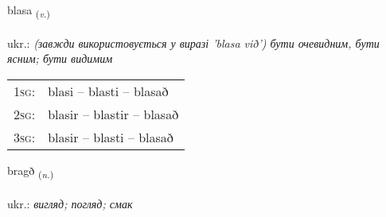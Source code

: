 \documentclass[frontgrid, backgrid]{flacards}\usepackage[]{graphicx}\usepackage[]{xcolor}
\begin{document}
\renewcommand{\flhead}{\vskip5pt \fboxsep=0pt {\small\bfseries\footnotesize Sagnorð | дієслово}}
\renewcommand{\fcfoot}{\vskip5pt \fboxsep=0pt \hspace{2pt}{\small\bfseries\footnotesize 2K}}

\renewcommand{\blhead}{\vskip5pt {\small\bfseries\footnotesize Sagnorð | дієслово }}
\renewcommand{\bcfoot}{\vskip5pt \hspace{2pt}{\small\bfseries\footnotesize 2K}}


{blasa \small{\textsubscript{(\textit{v.})}} \\[1ex] %
\textphonetic{[plaːsa]} \\
ukr.: \emph{(завжди використовується у виразі 'blasa við') бути очевидним, бути ясним; бути видимим} \\  [2ex]
\renewcommand*{\arraystretch}{0.8}
\begin{tabular}{p{1cm}l}
\textsc{1sg}: & blasi -- blasti -- blasað \\ 
\textsc{2sg}: & blasir -- blastir -- blasað \\ 
\textsc{3sg}: & blasir -- blasti -- blasað \\ 
\end{tabular}
}

\renewcommand{\flhead}{\vskip5pt \fboxsep=0pt {\small\bfseries\footnotesize Nafnorð | іменник}}
\renewcommand{\fcfoot}{\vskip5pt \fboxsep=0pt \hspace{2pt}{\small\bfseries\footnotesize 2K}}

\renewcommand{\blhead}{\vskip5pt {\small\bfseries\footnotesize Nafnorð | іменник }}
\renewcommand{\bcfoot}{\vskip5pt \hspace{2pt}{\small\bfseries\footnotesize 2K}}


{bragð \small{\textsubscript{(\textit{n.})}} \\[1ex] %
\textphonetic{[praɣð]} \\
ukr.: \emph{вигляд; погляд; смак} \\  [2ex]
\renewcommand*{\arraystretch}{0.8}
}
\end{document}
